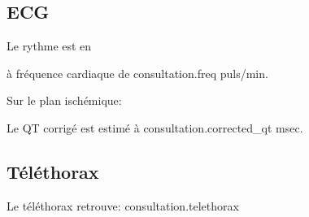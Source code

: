 \documentclass[12pt,a4paper]{article}
\begin{document}
\subsection{ECG}
Le rythme est en {%
          à fréquence cardiaque de {{ consultation.freq }} puls/min.\\

  {%
    {%
      Sur le plan ischémique: {%
              {%
                      {%
            Le QT corrigé est estimé à {{ consultation.corrected_qt }} msec. \\
            
            {%
              \subsection{Téléthorax}
              Le téléthorax retrouve: {{ consultation.telethorax }} \\
              
}}}}}}}
\end{document}
